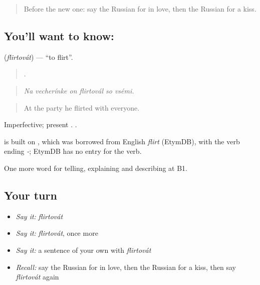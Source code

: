 \label{lesson:RU-C493-flirtovat}



\begin{quote}
Before the new one: say the Russian for in love, then the Russian for a kiss.
\end{quote}

\subsection*{You'll want to know: }
\textbf{} (\emph{flirtovát}) — \textquotedblleft{}to flirt\textquotedblright{}.

\begin{quote}
     .
\end{quote}

\begin{quote}
\emph{Na vecherínke on flirtovál so vsémi.}
\end{quote}

\begin{quote}
At the party he flirted with everyone.
\end{quote}

Imperfective; present . \emph{  }.

\begin{cousinweb}
\emph{} is built on \emph{}, which was borrowed from English \emph{flirt} (EtymDB), with the verb ending \emph{-}; EtymDB has no entry for the verb.
\end{cousinweb}

\begin{grammarlens}[title={What you've built}]
One more word for telling, explaining and describing at B1.
\end{grammarlens}

\subsection*{Your turn}
\begin{itemize}
\raggedright
  \item \emph{Say it:} \emph{flirtovát}
  \item \emph{Say it:} \emph{flirtovát}, once more
  \item \emph{Say it:} a sentence of your own with \emph{flirtovát}
  \item \emph{Recall:} say the Russian for in love, then the Russian for a kiss, then say \emph{flirtovát} again
\end{itemize}

